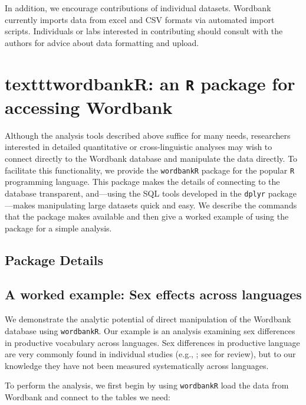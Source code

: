 \documentclass[doc,noapacite]{apa2}
\newcommand{\comment}[1]{\marginpar[]{\small \textcolor{blue}{#1}}}
\begin{document}
In addition, we encourage contributions of individual datasets. Wordbank currently imports data from excel and CSV formats via automated import scripts. Individuals or labs interested in contributing should consult with the authors for advice about data formatting and upload. \comment{MORE HERE?}

\section{texttt{wordbankR}: an \texttt{R} package for accessing Wordbank}

Although the analysis tools described above suffice for many needs, researchers interested in detailed quantitative or cross-linguistic analyses may wish to connect directly to the Wordbank database and manipulate the data directly. To facilitate this functionality, we provide the \texttt{wordbankR} package for the popular \texttt{R} programming language. This package makes the details of connecting to the database transparent, and---using the SQL tools developed in the \texttt{dplyr} package \cite{wickham2014}---makes manipulating large datasets quick and easy. We describe the commands that the package makes available and then give a worked example of using the package for a simple analysis.

\subsection{Package Details}



\comment{TO DO: MAKE THE PACKAGE}

\subsection{A worked example: Sex effects across languages}

We demonstrate the analytic potential of direct manipulation of the Wordbank database using \texttt{wordbankR}. Our example is an analysis examining sex differences in productive vocabulary across languages. Sex differences in productive language are very commonly found in individual studies (e.g., ; see  for review), but to our knowledge they have not been measured systematically across languages. 

To perform the analysis, we first begin by using \texttt{wordbankR} load the data from Wordbank and connect to the tables we need:
\end{document}
